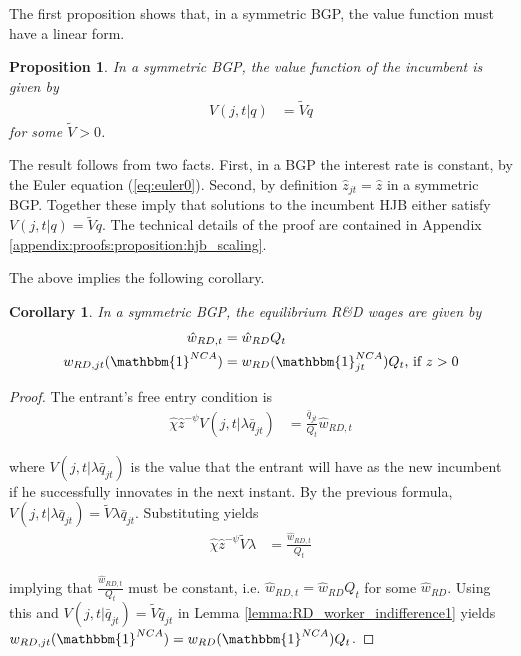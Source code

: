 \documentclass[11pt,english]{article}
\newtheorem{proposition}{Proposition}
\newtheorem{proposition_corollary}{Corollary}[proposition]
\begin{document}
The first proposition shows that, in a symmetric BGP, the value function must have a linear form.

\begin{proposition}\label{proposition:hjb_scaling}
	In a symmetric BGP, the value function of the incumbent is given by
	\begin{align*}
		V(j,t|q) &= \tilde{V} q
	\end{align*}
	for some $\tilde{V} > 0$.
\end{proposition}

The result follows from two facts. First, in a BGP the interest rate is constant, by the Euler equation (\ref{eq:euler0}). Second, by definition $\hat{z}_{jt} = \hat{z}$ in a symmetric BGP. Together these imply that solutions to the incumbent HJB either satisfy $V(j,t|q) = \tilde{V} q$. The technical details of the proof are contained in Appendix \ref{appendix:proofs:proposition:hjb_scaling}.

The above implies the following corollary.

\begin{proposition_corollary}
	In a symmetric BGP, the equilibrium R\&D wages are given by 
	\begin{align*}
	\hat{w}_{RD,t} &= \hat{w}_{RD} Q_t \\
	w_{RD,jt}(\mathbbm{1}^{NCA}) &= w_{RD}(\mathbbm{1}^{NCA}_{jt}) Q_t \textrm{, if $z > 0$}
	\end{align*}
\end{proposition_corollary}

\begin{proof}
	The entrant's free entry condition is
	\begin{align}
	\hat{\chi} \hat{z}^{-\psi} V(j,t|\lambda \bar{q}_{jt}) &= \frac{\bar{q}_{jt}}{Q_t} \hat{w}_{RD,t}
	\end{align}
	
	where $V(j,t|\lambda \bar{q}_{jt})$ is the value that the entrant will have as the new incumbent if he successfully innovates in the next instant. By the previous formula, $V(j,t | \lambda \bar{q}_{jt}) = \tilde{V} \lambda \bar{q}_{jt}$. Substituting yields
	\begin{align}
	\hat{\chi} \hat{z}^{-\psi} \tilde{V} \lambda &= \frac{\hat{w}_{RD,t}}{Q_t}
	\end{align}
	
	implying that $\frac{\hat{w}_{RD,t}}{Q_t}$ must be constant, i.e. $\hat{w}_{RD,t} = \hat{w}_{RD} Q_t$ for some $\hat{w}_{RD}$. Using this and $V(j,t | \bar{q}_{jt}) = \tilde{V}\bar{q}_{jt}$ in Lemma \ref{lemma:RD_worker_indifference1} yields $w_{RD,jt}(\mathbbm{1}^{NCA}) = w_{RD}(\mathbbm{1}^{NCA}) Q_t$. 
\end{proof}
\end{document}
